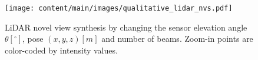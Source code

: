 \begin{figure}[t]
\centering
\texttt{[image: content/main/images/qualitative\_lidar\_nvs.pdf]}
\caption{LiDAR novel view synthesis by changing the sensor elevation angle $\theta [^{\circ}]$, pose $(x, y, z) [m]$ and number of beams. Zoom-in points are color-coded by intensity values.}
\label{fig:lidar_nvs}
\end{figure}